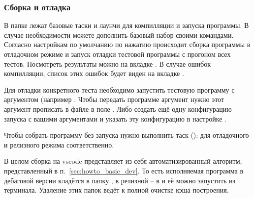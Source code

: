 \subsubsection{Сборка и отладка}
\label{sec:build_vscode}
В папке  лежат базовые таски и лаунчи для компилляции и запуска программы.
В случае необходимости можете дополнить базовый набор своими командами.
Согласно настройкам по умолчанию
по нажатию  происходит сборка программы в отладочном режиме и запуск отладки
тестовой программы с прогоном всех тестов.
Посмотреть результаты можно на вкладке .
В случае ошибок компилляции, список этих ошибок будет виден на вкладке .

Для отладки конкретного теста необходимо запустить тестовую программу с аргументом (например .
Чтобы передать программе аргумент нужно этот аргумент прописать в файле 
в поле . Либо создать ещё одну конфигурацию запуска с вашими аргументами и указать эту конфигурацию в настройке .

Чтобы собрать программу без запуска нужно выполнить таск (): 
для отладочного и релизного режима соответственно. 

В целом сборка на vscode представляет из себя автоматизированный алгоритм, представленный в п.~\ref{sec:howto_basic_dev}.
То есть исполняемая программа в дебаговой версии кладётся в папку , в релизной -- в  и её можно запустить из терминала.
Удаление этих папок ведёт к полной очистке кэша построения.

